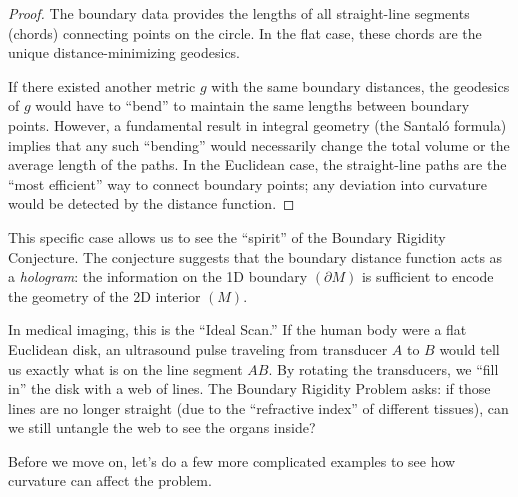 \begin{proof}
  The boundary data provides the lengths of all straight-line segments (chords) connecting points on the circle. In the flat case, these chords are the unique distance-minimizing geodesics. 

  If there existed another metric $g$ with the same boundary distances, the geodesics of $g$ would have to ``bend'' to maintain the same lengths between boundary points. However, a fundamental result in integral geometry (the Santaló formula) implies that any such ``bending'' would necessarily change the total volume or the average length of the paths. In the Euclidean case, the straight-line paths are the ``most efficient'' way to connect boundary points; any deviation into curvature would be detected by the distance function.
\end{proof}

This specific case allows us to see the ``spirit'' of the Boundary Rigidity Conjecture. The conjecture suggests that the boundary distance function acts as a \emph{hologram}: the information on the 1D boundary $(\partial M)$ is sufficient to encode the geometry of the 2D interior $(M)$. 

In medical imaging, this is the ``Ideal Scan.'' If the human body were a flat Euclidean disk, an ultrasound pulse traveling from transducer $A$ to $B$ would tell us exactly what is on the line segment $AB$. By rotating the transducers, we ``fill in'' the disk with a web of lines. The Boundary Rigidity Problem asks: if those lines are no longer straight (due to the ``refractive index'' of different tissues), can we still untangle the web to see the organs inside?

Before we move on, let's do a few more complicated examples to see how curvature can affect the problem.

